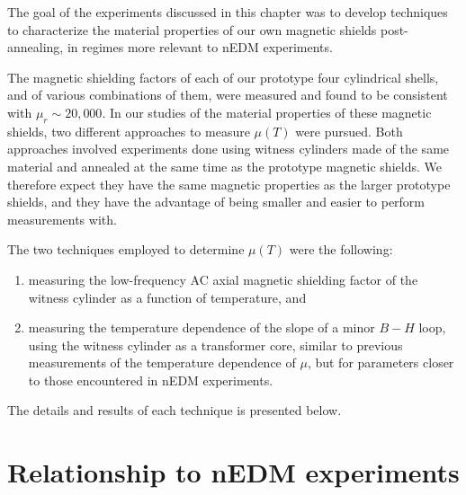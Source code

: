 The goal of the experiments discussed in this chapter was to develop
techniques to characterize the material properties of our own magnetic
shields post-annealing, in regimes more relevant to nEDM experiments.




The magnetic shielding factors of each of our prototype four
cylindrical shells, and of various combinations of them, were measured
and found to be consistent with $\mu_r\sim 20,000$.  In our studies of
the material properties of these magnetic shields, two different
approaches to measure $\mu(T)$ were pursued.  Both approaches involved
experiments done using witness cylinders made of the same material and
annealed at the same time as the prototype magnetic shields.  We
therefore expect they have the same magnetic properties as the larger
prototype shields, and they have the advantage of being smaller and
easier to perform measurements with.

The two techniques employed to determine $\mu(T)$ were the following:
\begin{enumerate}
\item measuring the low-frequency AC axial magnetic shielding factor
  of the witness cylinder as a function of temperature, and
\item measuring the temperature dependence of the slope of a minor $B-H$
  loop, using the witness cylinder as a transformer core, similar to
  previous measurements of the temperature dependence of $\mu$, but
  for parameters closer to those encountered in nEDM experiments.
\end{enumerate}
The details and results of each technique is presented below.







\section{Relationship to nEDM experiments\label{sec:relationship}}

